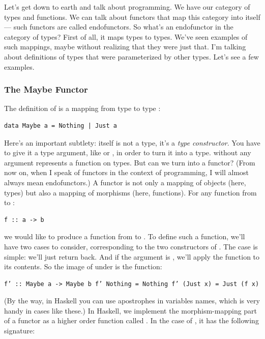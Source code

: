 Let's get down to earth and talk about programming. We have our category
of types and functions. We can talk about functors that map this
category into itself --- such functors are called endofunctors. So
what's an endofunctor in the category of types? First of all, it maps
types to types. We've seen examples of such mappings, maybe without
realizing that they were just that. I'm talking about definitions of
types that were parameterized by other types. Let's see a few examples.

\subsubsection{The Maybe Functor}\label{the-maybe-functor}

The definition of  is a mapping from type  to
type :

\begin{verbatim}
data Maybe a = Nothing | Just a
\end{verbatim}

Here's an important subtlety:  itself is not a type, it's
a \emph{type constructor}. You have to give it a type argument, like
 or , in order to turn it into a type.
 without any argument represents a function on types. But
can we turn  into a functor? (From now on, when I speak of
functors in the context of programming, I will almost always mean
endofunctors.) A functor is not only a mapping of objects (here, types)
but also a mapping of morphisms (here, functions). For any function from
 to :

\begin{verbatim}
f :: a -> b
\end{verbatim}

we would like to produce a function from  to
. To define such a function, we'll have two cases to
consider, corresponding to the two constructors of . The
 case is simple: we'll just return 
back. And if the argument is , we'll apply the function
 to its contents. So the image of  under
 is the function:

\begin{verbatim}
f’ :: Maybe a -> Maybe b f’ Nothing = Nothing f’ (Just x) = Just (f x)
\end{verbatim}

(By the way, in Haskell you can use apostrophes in variables names,
which is very handy in cases like these.) In Haskell, we implement the
morphism-mapping part of a functor as a higher order function called
. In the case of , it has the following
signature:


